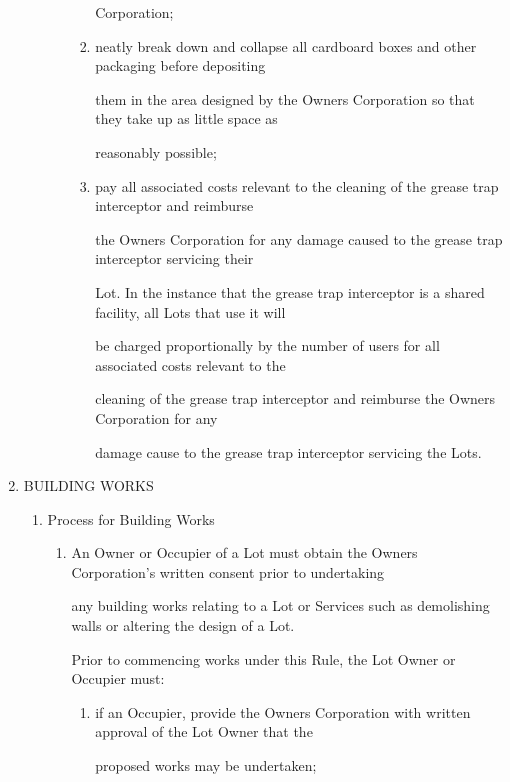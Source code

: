 \documentclass{article}
\begin{document}
\begin{enumerate}[label=\arabic*.]
\begin{enumerate}[label=\arabic{enumi}.\arabic*.]
\begin{enumerate}[label=(\arabic*)]
\begin{enumerate}[label=(\alph*)]
Corporation; 

\item  neatly break down and collapse all cardboard boxes and other packaging before depositing 

them in the area designed by the Owners Corporation so that they take up as little space as 

reasonably possible; 

\item  pay all associated costs relevant to the cleaning of the grease trap interceptor and reimburse 

the Owners Corporation for any damage caused to the grease trap interceptor servicing their 

Lot. In the instance that the grease trap interceptor is a shared facility, all Lots that use it will 

be charged proportionally by the number of users for all associated costs relevant to the 

cleaning of the grease trap interceptor and reimburse the Owners Corporation for any 

damage cause to the grease trap interceptor servicing the Lots. 

\end{enumerate}
\end{enumerate}
\end{enumerate}
\item  BUILDING WORKS 

\begin{enumerate}[label=\arabic{enumi}.\arabic*.]
\item  Process for Building Works 

\begin{enumerate}[label=(\arabic*)]
\item  An Owner or Occupier of a Lot must obtain the Owners Corporation’s written consent prior to undertaking 

any building works relating to a Lot or Services such as demolishing walls or altering the design of a Lot. 

Prior to commencing works under this Rule, the Lot Owner or Occupier must: 

\begin{enumerate}[label=(\alph*)]
\item  if an Occupier, provide the Owners Corporation with written approval of the Lot Owner that the 

proposed works may be undertaken; 


\end{enumerate}
\end{enumerate}
\end{enumerate}
\end{enumerate}
\end{document}
